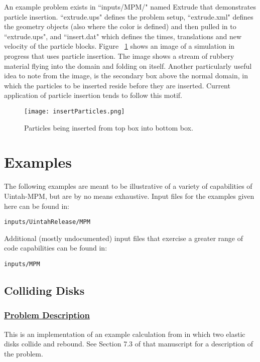 An example problem exists in ``inputs/MPM/" named Extrude that demonstrates 
particle insertion.  ``extrude.ups" defines the problem setup, ``extrude.xml" defines 
the geometry objects (also where the color is defined) and then pulled in to 
``extrude.ups", and ``insert.dat" which defines the times, translations and new 
velocity of the particle blocks.  Figure ~\ref{figinsertparticles} shows an image 
of a simulation in progress that uses particle insertion.  The image shows a stream 
of rubbery material flying into the domain and folding on itself.  Another particularly 
useful idea to note from the image, is the secondary box above the normal domain, in which 
the particles to be inserted reside before they are inserted.  Current application 
of particle insertion tends to follow this motif.

\begin{figure}
  \center
  \texttt{[image: insertParticles.png]}
  \caption{Particles being inserted from top box into bottom box.}
  \label{figinsertparticles}
\end{figure}


%
\section{Examples} \label{Sec:ExamplesMPM}

The following examples are meant to be illustrative of a variety of
capabilities of Uintah-MPM, but are by no means exhaustive.  Input files
for the examples given here can be found in:
\begin{Verbatim}[fontsize=\footnotesize]
inputs/UintahRelease/MPM
\end{Verbatim}

Additional (mostly undocumented) input files that exercise a greater range
of code capabilities can be found in:
\begin{Verbatim}[fontsize=\footnotesize]
inputs/MPM
\end{Verbatim}


\subsection*{\center Colliding Disks}
\subsubsection*{\underline{Problem Description}}
This is an implementation of an example calculation from \cite{sulskycmame} in
which two elastic disks collide and rebound.  See Section 7.3 of that
manuscript for a description of the problem.
 
